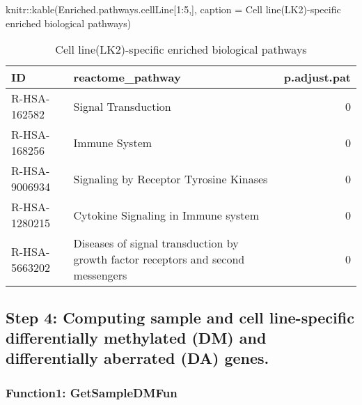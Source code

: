 \documentclass[]{article}
\newcommand{\hlnum}[1]{\textcolor[rgb]{0.816,0.125,0.439}{#1}}%
\newcommand{\hlstr}[1]{\textcolor[rgb]{0.251,0.627,0.251}{#1}}%
\newcommand{\hlstd}[1]{\textcolor[rgb]{0.251,0.251,0.251}{#1}}%
\newenvironment{Shaded}{\begin{myshaded}}{\end{myshaded}}
\newcommand{\DecValTok}[1]{\hlnum{#1}}
\newcommand{\SpecialCharTok}[1]{\hlstr{#1}}
\newcommand{\StringTok}[1]{\hlstr{#1}}
\newcommand{\FunctionTok}[1]{\hlstd{#1}}
\newcommand{\AttributeTok}[1]{{#1}}
\newcommand{\NormalTok}[1]{\hlstd{#1}}
\begin{document}
\begin{Shaded}
\begin{Highlighting}[]
\NormalTok{knitr}\SpecialCharTok{::}\FunctionTok{kable}\NormalTok{(Enriched.pathways.cellLine[}\DecValTok{1}\SpecialCharTok{:}\DecValTok{5}\NormalTok{,], }\AttributeTok{caption =} \StringTok{\textquotesingle{}Cell line(LK2){-}specific enriched biological pathways\textquotesingle{}}\NormalTok{)}
\end{Highlighting}
\end{Shaded}

\begin{table}

\caption{\label{tab:unnamed-chunk-80}Cell line(LK2)-specific enriched biological pathways}
\centering
\begin{tabular}[t]{l|l|r}
\hline
ID & reactome\_pathway & p.adjust.pat\\
\hline
R-HSA-162582 & Signal Transduction & 0\\
\hline
R-HSA-168256 & Immune System & 0\\
\hline
R-HSA-9006934 & Signaling by Receptor Tyrosine Kinases & 0\\
\hline
R-HSA-1280215 & Cytokine Signaling in Immune system & 0\\
\hline
R-HSA-5663202 & Diseases of signal transduction by growth factor receptors and second messengers & 0\\
\hline
\end{tabular}
\end{table}

\hypertarget{step-4-computing-sample-and-cell-line-specific-differentially-methylated-dm-and-differentially-aberrated-da-genes.}{%
\subsection{\texorpdfstring{ Step 4: Computing sample and cell line-specific differentially methylated (DM) and differentially aberrated (DA) genes.}{  Step 4: Computing sample and cell line-specific differentially methylated (DM) and differentially aberrated (DA) genes.}}\label{step-4-computing-sample-and-cell-line-specific-differentially-methylated-dm-and-differentially-aberrated-da-genes.}}

\hypertarget{function1-getsampledmfun}{%
\subsubsection{\texorpdfstring{ Function1: GetSampleDMFun}{  Function1: GetSampleDMFun}}\label{function1-getsampledmfun}}
\end{document}
